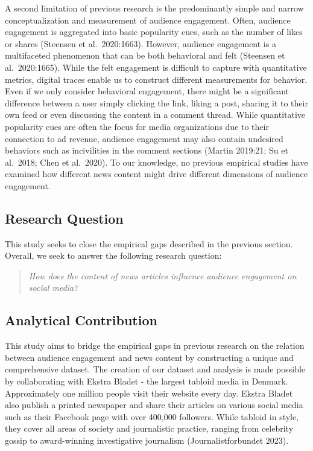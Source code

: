 \documentclass[
]{article}
\begin{document}
A second limitation of previous research is the predominantly simple and
narrow conceptualization and measurement of audience engagement. Often,
audience engagement is aggregated into basic popularity cues, such as
the number of likes or shares (Steensen et al.~2020:1663). However,
audience engagement is a multifaceted phenomenon that can be both
behavioral and felt (Steensen et al.~2020:1665). While the felt
engagement is difficult to capture with quantitative metrics, digital
traces enable us to construct different measurements for behavior. Even
if we only consider behavioral engagement, there might be a significant
difference between a user simply clicking the link, liking a post,
sharing it to their own feed or even discussing the content in a comment
thread. While quantitative popularity cues are often the focus for media
organizations due to their connection to ad revenue, audience engagement
may also contain undesired behaviors such as incivilities in the comment
sections (Martin 2019:21; Su et al.~2018; Chen et al.~2020). To our
knowledge, no previous empirical studies have examined how different
news content might drive different dimensions of audience engagement.

\hypertarget{research-question}{%
\subsection{Research Question}\label{research-question}}

This study seeks to close the empirical gaps described in the previous
section. Overall, we seek to answer the following research question:

\begin{quote}
\emph{How does the content of news articles influence audience
engagement on social media?}
\end{quote}

\hypertarget{analytical-contribution}{%
\subsection{Analytical Contribution}\label{analytical-contribution}}

This study aims to bridge the empirical gaps in previous research on the
relation between audience engagement and news content by constructing a
unique and comprehensive dataset. The creation of our dataset and
analysis is made possible by collaborating with Ekstra Bladet - the
largest tabloid media in Denmark. Approximately one million people visit
their website every day. Ekstra Bladet also publish a printed newspaper
and share their articles on various social media such as their Facebook
page with over 400,000 followers. While tabloid in style, they cover all
areas of society and journalistic practice, ranging from celebrity
gossip to award-winning investigative journalism (Journalistforbundet
2023).
\end{document}
